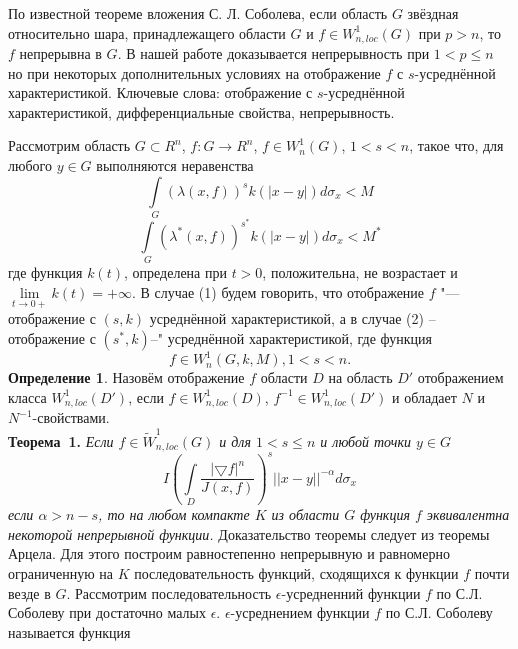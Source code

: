 \vzmscaption
По известной теореме вложения С. Л. Соболева, если область $G$ звёздная относительно шара, принадлежащего области $G$ и $f \in W^{1}_{n,loc}(G)$ при $p>n$, то $f$ непрерывна в $G$. В нашей работе доказывается непрерывность при $1<p\leq n$ но при некоторых дополнительных условиях на отображение $f$ с $s$-усреднённой характеристикой.
Ключевые слова: отображение с $s$-усреднённой характеристикой, дифференциальные свойства, непрерывность.

Рассмотрим область $G\subset R^n$, $f:G\to R^n$, $f\in W^{1}_{n}(G)$, $1<s<n$, такое что, для любого $y\in G$ выполняются неравенства
\begin{equation}
\int\limits_{G}(\lambda(x,f))^{s}k(|x-y|)d\sigma_{x}<M
\end{equation}
\begin{equation}
\int\limits_{G}(\lambda^{*}(x,f))^{s^{*}}k(|x-y|)d\sigma_{x}<M^{*}
\end{equation}
где функция $k(t)$, определена при $t>0$, положительна, не возрастает и $\lim\limits_{t\to 0+}k(t)=+\infty$. В случае (1) будем говорить, что отображение $f$ "--- отображение с $(s,k)$ усреднённой характеристикой, а в случае (2) – отображение с $(s^{*},k)$--" усреднённой характеристикой, где функция $$f\in W^{1}_{n}(G,k,M), 1<s<n.$$
\textbf{Определение 1}. Назовём отображение $f$ области $D$ на область $D'$ отображением класса $W^{1}_{n,loc}(D')$, если $f \in W^{1}_{n,loc}(D)$, $f^{-1} \in W^{1}_{n,loc}(D')$ и обладает $N$ и $N^{-1}$-свойствами.\\
\textbf{Теорема~1.} {\it Если $f\in\widetilde{W}_{n,loc}^1(G) $ и для $1<s\leq n$ и любой точки $y\in G$
\begin{equation}
I\left(
\int\limits_D\frac{|\bigtriangledown f|^{n}}{J(x,f)}
\right)^{s}||x-y||^{-\alpha}d\sigma_{x}
\end{equation}
если $\alpha>n-s$, то на любом компакте $K$ из области $G$ функция $f$ эквивалентна некоторой непрерывной функции.} Доказательство теоремы следует из теоремы Арцела.
Для этого построим равностепенно непрерывную и равномерно ограниченную на $K$ последовательность функций, сходящихся к функции $f$ почти везде в $G$. Рассмотрим последовательность $\epsilon$-усредненний функции $f$ по С.Л. Соболеву при достаточно малых $\epsilon$. $\epsilon$-усреднением функции $f$ по С.Л. Соболеву называется функция
